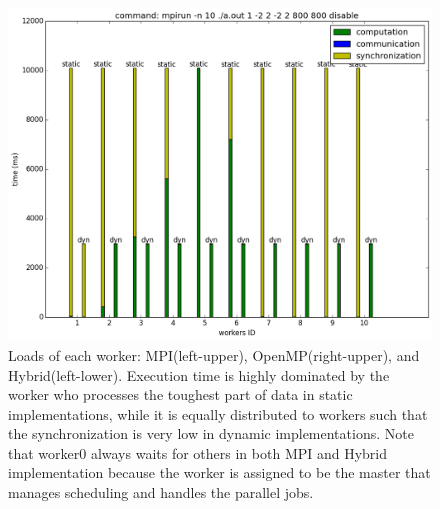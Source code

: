 \documentclass[12pt]{article}
\makeatletter
\renewenvironment{itemize}
{\list{$\bullet$}{\leftmargin\z@ \labelwidth\z@ \itemindent-\leftmargin
\let\makelabel\descriptionlabel}}
{\endlist}
\makeatother
\begin{document}
\begin{itemize}
    \vspace{-1cm}
    \begin{figure}
        \hspace{-1cm}
        \includegraphics[scale=.35]{./threads_load_MPI.png}
        \hspace{1cm}
        \vspace{-.5cm}
        \caption{Loads of each worker: \hspace{\textwidth}MPI(left-upper), OpenMP(right-upper), and Hybrid(left-lower). Execution time is highly dominated by the worker who processes the toughest part of data in static implementations, while it is equally distributed to workers such that the synchronization is very low in dynamic implementations. Note that worker0 always waits for others in both MPI and Hybrid implementation because the worker is assigned to be the master that manages scheduling and handles the parallel jobs.}
    \end{figure}


\end{itemize}
\end{document}
